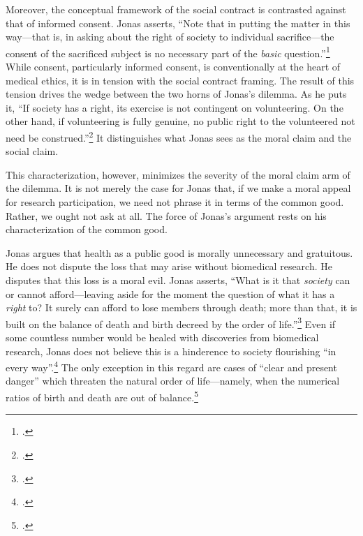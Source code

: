 \documentclass[letterpaper,notitlepage,12pt]{article}
\begin{document}
Moreover, the conceptual framework of the social contract is contrasted against that of informed consent.
Jonas asserts, ``Note that in putting the matter in this way---that is, in
asking about the right of society to individual sacrifice---the consent of the
sacrificed subject is no necessary part of the \textit{basic}
question.''\footcite[p. 221]{jonas_philosophical_1969}
While consent, particularly informed consent, is conventionally at the heart of
medical ethics, it is in tension with the social contract framing.
The result of this tension drives the wedge between the two horns of Jonas's
dilemma.
As he puts it, ``If society has a right, its exercise is not contingent on
volunteering. On the other hand, if volunteering is fully genuine, no public
right to the volunteered not need be
construed.''\footcite[p. 221]{jonas_philosophical_1969}
It distinguishes what Jonas sees as the moral claim and the social claim.

This characterization, however, minimizes the severity of the moral claim arm
of the dilemma.
It is not merely the case for Jonas that, if we make a moral appeal for
research participation, we need not phrase it in terms of the common good.
Rather, we ought not ask at all.
The force of Jonas's argument rests on his characterization of the common good.

Jonas argues that health as a public good is morally unnecessary and gratuitous.
He does not dispute the loss that may arise without biomedical research.
He disputes that this loss is a moral evil.
Jonas asserts, ``What is it that \textit{society} can or cannot
afford---leaving aside for the moment the question of what it has a
\textit{right} to? It surely can afford to lose members through death;
more than that, it is built on the balance of death and birth decreed by
the order of life.''\footcite[p. 228]{jonas_philosophical_1969}
Even if some countless number would be healed with discoveries from
biomedical research, Jonas does not believe this is a hinderence to
society flourishing
``in every way''.\footcite[p. 228]{jonas_philosophical_1969}
The only exception in this regard are cases of ``clear and present danger''
which threaten the natural order of life---namely, when the numerical
ratios of birth and death are out of
balance.\footcite[p. 228]{jonas_philosophical_1969}
\end{document}
